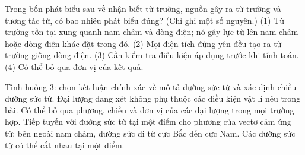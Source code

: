 \begin{ex}
Trong bốn phát biểu sau về nhận biết từ trường, nguồn gây ra từ trường và tương tác từ, có bao nhiêu phát biểu đúng? (Chỉ ghi một số nguyên.) (1) Từ trường tồn tại xung quanh nam châm và dòng điện; nó gây lực từ lên nam châm hoặc dòng điện khác đặt trong đó. (2) Mọi điện tích đứng yên đều tạo ra từ trường giống dòng điện. (3) Cần kiểm tra điều kiện áp dụng trước khi tính toán. (4) Có thể bỏ qua đơn vị của kết quả.
\end{ex}

\begin{ex}
Tình huống 3: chọn kết luận chính xác về mô tả đường sức từ và xác định chiều đường sức từ.
\choice
{Đại lượng đang xét không phụ thuộc các điều kiện vật lí nêu trong bài.}
{Có thể bỏ qua phương, chiều và đơn vị của các đại lượng trong mọi trường hợp.}
{\True Tiếp tuyến với đường sức từ tại một điểm cho phương của vectơ cảm ứng từ; bên ngoài nam châm, đường sức đi từ cực Bắc đến cực Nam.}
{Các đường sức từ có thể cắt nhau tại một điểm.}
\end{ex}

